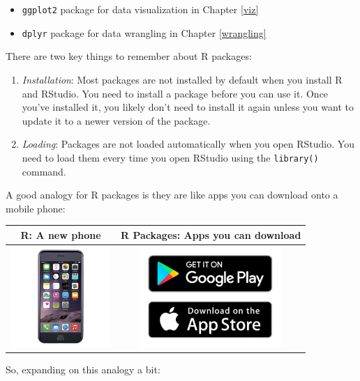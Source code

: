 \documentclass[12pt,]{krantz}
\providecommand{\tightlist}{%
  \setlength{\itemsep}{0pt}\setlength{\parskip}{0pt}}
\theoremstyle{definition}
\theoremstyle{definition}
\theoremstyle{definition}
\theoremstyle{remark}
\begin{document}
\begin{itemize}
\tightlist
\item
  \texttt{ggplot2} package for data visualization in Chapter \ref{viz}
\item
  \texttt{dplyr} package for data wrangling in Chapter \ref{wrangling}
\end{itemize}

There are two key things to remember about R packages:

\begin{enumerate}
\def\labelenumi{\arabic{enumi}.}
\tightlist
\item
  \emph{Installation}: Most packages are not installed by default when
  you install R and RStudio. You need to install a package before you
  can use it. Once you've installed it, you likely don't need to install
  it again unless you want to update it to a newer version of the
  package.
\item
  \emph{Loading}: Packages are not loaded automatically when you open
  RStudio. You need to load them every time you open RStudio using the
  \texttt{library()} command.
\end{enumerate}

A good analogy for R packages is they are like apps you can download
onto a mobile phone:

\begin{longtable}[]{@{}cc@{}}
\toprule
R: A new phone & R Packages: Apps you can download\tabularnewline
\midrule
\endhead
\includegraphics[height=1.50000in]{images/iphone.jpg} &
\includegraphics[height=1.50000in]{images/apps.jpg}\tabularnewline
\bottomrule
\end{longtable}

So, expanding on this analogy a bit:
\end{document}
